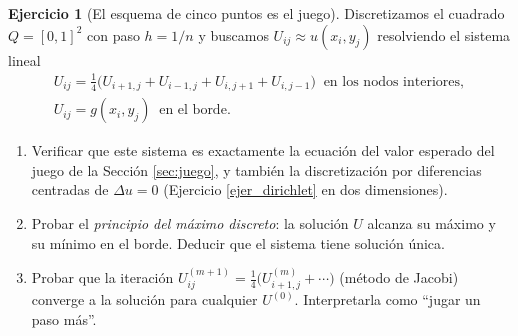 \documentclass[12pt, a4paper]{amsbook}
\theoremstyle{remark}
\theoremstyle{definition}
\newtheorem{ejer}[teo]{Ejercicio}
\numberwithin{section}{chapter}
\numberwithin{subsection}{section}
\numberwithin{equation}{section}
\numberwithin{figure}{chapter}
\begin{document}
\begin{ejer}[El esquema de cinco puntos es el juego]
Discretizamos el cuadrado $Q=[0,1]^2$ con paso $h=1/n$ y buscamos $U_{ij}\approx u(x_i,y_j)$ resolviendo el sistema lineal
\begin{gather*}
U_{ij} = \frac14\bigl(U_{i+1,j}+U_{i-1,j}+U_{i,j+1}+U_{i,j-1}\bigr)\ \text{ en los nodos interiores},\\
U_{ij} = g(x_i,y_j) \ \text{ en el borde}.
\end{gather*}
\begin{enumerate}
\item Verificar que este sistema es exactamente la ecuación del valor esperado del juego de la Sección \ref{sec:juego}, y también la discretización por diferencias centradas de $\Delta u = 0$ (Ejercicio \ref{ejer_dirichlet} en dos dimensiones).
\item Probar el \emph{principio del máximo discreto}: la solución $U$ alcanza su máximo y su mínimo en el borde. Deducir que el sistema tiene solución única.
\item Probar que la iteración $U^{(m+1)}_{ij} = \frac14\bigl(U^{(m)}_{i+1,j}+\cdots\bigr)$ (método de Jacobi) converge a la solución para cualquier $U^{(0)}$. Interpretarla como ``jugar un paso más''.
\end{enumerate}
\end{ejer}
\end{document}
